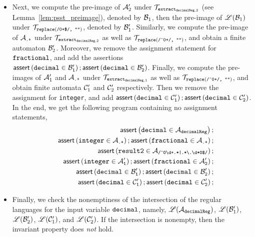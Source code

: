 \begin{itemize}
\item Next, we compute the pre-image of $\mathcal{A}'_2$ under $\mathcal{T}_{\tt extract_{decimalReg,2}}$ (see Lemma~\ref{lem:psst_preimage}), denoted by $\mathcal{B}_1$, then the pre-image of $\mathscr{L}(\mathcal{B}_1)$ under $\mathcal{T}_{\tt replace(\mbox{\scriptsize \tt /0+\$/, ""})}$, denoted by $\mathcal{B}'_1$. Similarly, we compute the pre-image of $\mathcal{A}_{\scriptsize\mbox{\tt.+}}$ under $\mathcal{T}_{\tt extract_{decimalReg,2}}$ as well as $\mathcal{T}_{\tt replace(\mbox{\scriptsize \tt /\^{}0+/, ""})}$,  and obtain a finite automaton $\mathcal{B}'_2$. Moreover, we remove the assignment statement for  $\tt fractional$, and add the assertions $\textsf{assert}\left(\tt decimal \in \mathcal{B}'_1\right); \textsf{assert}\left(\tt decimal \in \mathcal{B}'_2\right)$. Finally, we compute the pre-images of $\mathcal{A}'_1$ and $\mathcal{A}_{\scriptsize\mbox{\tt.+}}$ under $\mathcal{T}_{\tt extract_{decimalReg, 1}}$ as well as $\mathcal{T}_{\tt replace(\mbox{\scriptsize \tt /\^{}0+/, ""})}$, and obtain finite automata $\mathcal{C}'_1$ and $\mathcal{C}'_2$ respectively. Then we remove the assignment for {\tt integer}, and add $\textsf{assert}\left(\tt decimal \in \mathcal{C}'_1\right);\textsf{assert}\left(\tt decimal \in \mathcal{C}'_2\right)$. In the end, we get the following program containing no assignment statements, 
\begin{eqnarray}\label{eqn:exmp-2}
& & \textsf{assert}\left(\tt decimal \in \mathcal{A}_{decimalReg}\right);\nonumber \\
&&  \textsf{assert}\left(\tt integer \in \mathcal{A}_{\scriptsize\mbox{\tt.+}}\right); 
  \textsf{assert}\left(\tt fractional \in \mathcal{A}_{\scriptsize\mbox{\tt.+}}\right); \nonumber\\
 && \textsf{assert}\left(\tt result2 \in \mathcal{A}_{\scriptsize\mbox{\tt /\^{}0\textbackslash d+.*|.*{\scriptsize\textbackslash}.\textbackslash d*0\$/}}\right); \nonumber\\
  && \textsf{assert}\left(\tt integer \in \mathcal{A}'_1\right);\textsf{assert}\left(\tt fractional \in \mathcal{A}'_2\right); \nonumber\\
    && \textsf{assert}\left(\tt decimal \in \mathcal{B}'_1\right);\textsf{assert}\left(\tt decimal \in \mathcal{B}'_2\right); \nonumber\\
    && \textsf{assert}\left(\tt decimal \in \mathcal{C}'_1\right);\textsf{assert}\left(\tt decimal \in \mathcal{C}'_2\right); 
\end{eqnarray}
%
\item Finally, we check the nonemptiness of the intersection of the regular languages for the input variable $\tt decimal$, namely, $\mathscr{L}(\mathcal{A}_{\tt decimalReg})$, $\mathscr{L}(\mathcal{B}'_1)$, $\mathscr{L}(\mathcal{B}'_2)$, $\mathscr{L}(\mathcal{C}'_1)$, and $\mathscr{L}(\mathcal{C}'_2)$. If the intersection is nonempty, then the invariant property does \emph{not} hold.
\end{itemize}


